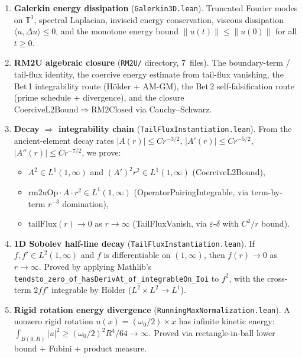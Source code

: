 \documentclass[12pt, reqno]{amsart}
\theoremstyle{definition}
\theoremstyle{remark}
\numberwithin{equation}{section}
\begin{document}
\begin{enumerate}[leftmargin=2em]
\item \textbf{Galerkin energy dissipation} (\texttt{Galerkin3D.lean}).
  Truncated Fourier modes on $\mathbb{T}^3$, spectral Laplacian,
  inviscid energy conservation, viscous dissipation
  $\langle u, \Delta u\rangle \le 0$, and the monotone energy bound
  $\|u(t)\| \le \|u(0)\|$ for all $t \ge 0$.

\item \textbf{RM2U algebraic closure} (\texttt{RM2U/} directory, 7~files).
  The boundary-term / tail-flux identity, the coercive energy estimate
  from tail-flux vanishing, the Bet\,1 integrability route (Hölder + AM-GM),
  the Bet\,2 self-falsification route (prime schedule + divergence),
  and the closure $\mathrm{CoerciveL2Bound} \Rightarrow \mathrm{RM2Closed}$
  via Cauchy--Schwarz.

\item \textbf{Decay $\Rightarrow$ integrability chain}
  (\texttt{TailFluxInstantiation.lean}).
  From the ancient-element decay rates
  $|A(r)| \le C r^{-3/2}$, $|A'(r)| \le C r^{-5/2}$,
  $|A''(r)| \le C r^{-7/2}$, we prove:
  \begin{itemize}
    \item $A^2 \in L^1(1,\infty)$ and $(A')^2 r^2 \in L^1(1,\infty)$
      (CoerciveL2Bound),
    \item $\mathrm{rm2uOp} \cdot A \cdot r^2 \in L^1(1,\infty)$
      (OperatorPairingIntegrable, via term-by-term $r^{-3}$ domination),
    \item $\mathrm{tailFlux}(r) \to 0$ as $r \to \infty$
      (TailFluxVanish, via $\varepsilon$-$\delta$ with $C^2/r$ bound).
  \end{itemize}

\item \textbf{1D Sobolev half-line decay} (\texttt{TailFluxInstantiation.lean}).
  If $f, f' \in L^2(1,\infty)$ and $f$ is differentiable on $(1,\infty)$,
  then $f(r) \to 0$ as $r \to \infty$.  Proved by applying Mathlib's
  \texttt{tendsto\_zero\_of\_hasDerivAt\_of\_integrableOn\_Ioi} to $f^2$,
  with the cross-term $2ff'$ integrable by Hölder ($L^2 \times L^2 \to L^1$).

\item \textbf{Rigid rotation energy divergence}
  (\texttt{RunningMaxNormalization.lean}).
  A nonzero rigid rotation $u(x) = (\omega_0/2) \times x$ has infinite
  kinetic energy: $\int_{B(0,R)} |u|^2 \ge (\omega_0/2)^2 R^4/64 \to \infty$.
  Proved via rectangle-in-ball lower bound + Fubini + product measure.


\end{enumerate}
\end{document}
